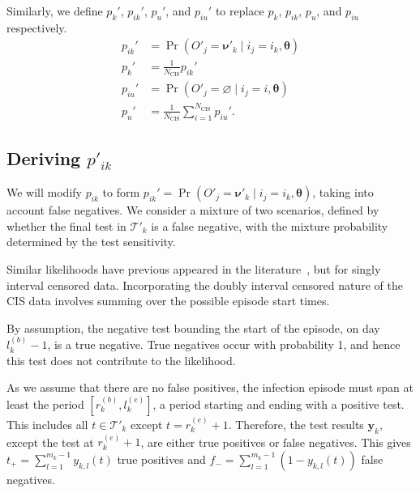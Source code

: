 \documentclass[referee,useAMS,usenatbib]{biom}
\DeclareMathOperator{\prob}{\mathrm{Pr}}
\renewcommand{\vec}[1]{\bm{#1}}
\newcommand{\Ncis}{N_\text{CIS}}
\newcommand{\sched}{\mathcal{T}}
\begin{document}
Similarly, we define $p_k'$, $p_{ik}'$, $p_u'$, and $p_{iu}'$ to replace $p_k$, $p_{ik}$, $p_u$, and $p_{iu}$ respectively.
\begin{align}
    p_{ik}' &= \prob(O'_j = \vec{\nu}'_k \mid i_j = i_k, \vec{\theta}) \\
    p_k' &= \frac{1}{\Ncis} p_{ik}' \\
    p_{iu}' &= \prob(O'_j = \varnothing \mid i_j = i, \vec{\theta}) \\
    p_u' &= \frac{1}{\Ncis} \sum_{i=1}^{\Ncis} p_{iu}'.
\end{align}

\subsection{Deriving $p'_{ik}$} \label{imperf-test:sec:modifying-p_ia}

We will modify $p_{ik}$ to form $p_{ik}' = \prob(O'_j = \vec{\nu}'_k \mid i_j = i_k, \vec{\theta})$, taking into account false negatives.
We consider a mixture of two scenarios, defined by whether the final test in $\sched'_{k}$ is a false negative, with the mixture probability determined by the test sensitivity.

Similar likelihoods have previous appeared in the literature~\citep[e.g.][eq.\ (2)]{piresIntervalMisclassify}, but for singly interval censored data.
Incorporating the doubly interval censored nature of the CIS data involves summing over the possible episode start times.


By assumption, the negative test bounding the start of the episode, on day $l_k^{(b)}-1$, is a true negative.
True negatives occur with probability 1, and hence this test does not contribute to the likelihood.

As we assume that there are no false positives, the infection episode must span at least the period $[r^{(b)}_k, l^{(e)}_k]$, a period starting and ending with a positive test.
This includes all $t \in \sched'_k$ except $t = r_k^{(e)}+1$.
Therefore, the test results $\vec{y}_k$, except the test at $r_k^{(e)}+1$, are either true positives or false negatives.
This gives $t_+ = \sum_{l=1}^{m_k-1} y_{k,l}(t)$ true positives and $f_- = \sum_{l=1}^{m_k-1} (1 - y_{k,l}(t))$ false negatives.
\end{document}

